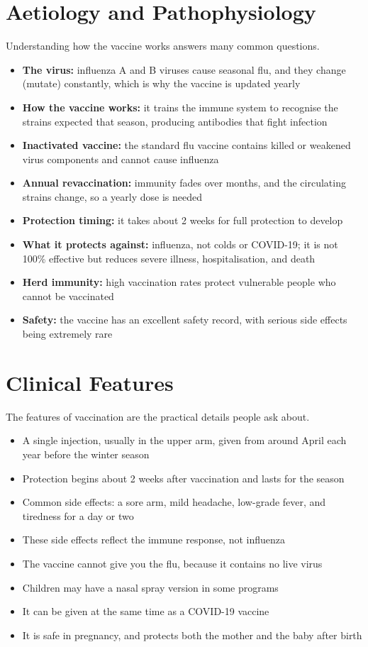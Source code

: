 \section*{Aetiology and Pathophysiology}
Understanding how the vaccine works answers many common questions.
\begin{itemize}
    \item \textbf{The virus:} influenza A and B viruses cause seasonal flu, and they change (mutate) constantly, which is why the vaccine is updated yearly
    \item \textbf{How the vaccine works:} it trains the immune system to recognise the strains expected that season, producing antibodies that fight infection
    \item \textbf{Inactivated vaccine:} the standard flu vaccine contains killed or weakened virus components and cannot cause influenza
    \item \textbf{Annual revaccination:} immunity fades over months, and the circulating strains change, so a yearly dose is needed
    \item \textbf{Protection timing:} it takes about 2 weeks for full protection to develop
    \item \textbf{What it protects against:} influenza, not colds or COVID-19; it is not 100\% effective but reduces severe illness, hospitalisation, and death
    \item \textbf{Herd immunity:} high vaccination rates protect vulnerable people who cannot be vaccinated
    \item \textbf{Safety:} the vaccine has an excellent safety record, with serious side effects being extremely rare
\end{itemize}

\section*{Clinical Features}
The features of vaccination are the practical details people ask about.
\begin{itemize}
    \item A single injection, usually in the upper arm, given from around April each year before the winter season
    \item Protection begins about 2 weeks after vaccination and lasts for the season
    \item Common side effects: a sore arm, mild headache, low-grade fever, and tiredness for a day or two
    \item These side effects reflect the immune response, not influenza
    \item The vaccine cannot give you the flu, because it contains no live virus
    \item Children may have a nasal spray version in some programs
    \item It can be given at the same time as a COVID-19 vaccine
    \item It is safe in pregnancy, and protects both the mother and the baby after birth
\end{itemize}

